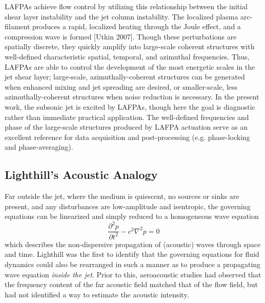 LAFPAs achieve flow control by utilizing this relationship between the initial shear layer instability and the jet column instability.
The localized plasma arc-filament produces a rapid, localized heating through the Joule effect, and a compression wave is formed [Utkin 2007].
Though these perturbations are spatially discrete, they quickly amplify into large-scale coherent structures with well-defined characteristic spatial, temporal, and azimuthal frequencies.
Thus, LAFPAs are able to control the development of the most energetic scales in the jet shear layer; large-scale, azimuthally-coherent structures can be generated when enhanced mixing and jet spreading are desired, or smaller-scale, less azimuthally-coherent structures when noise reduction is necessary. 
In the present work, the subsonic jet is excited by LAFPAs, though here the goal is diagnostic rather than immediate practical application.
The well-defined frequencies and phase of the large-scale structures produced by LAFPA actuation serve as an excellent reference for data acquisition and post-processing (e.g. phase-locking and phase-averaging).

\subsection{Lighthill's Acoustic Analogy}
Far outside the jet, where the medium is quiescent, no sources or sinks are present, and any disturbances are low-amplitude and isentropic, the governing equations can be linearized and simply reduced to a homogeneous wave equation
\begin{equation}
	\frac{\partial^2 p}{\partial t^2} - c^2 \nabla ^2 p = 0
\end{equation}
which describes the non-dispersive propagation of (acoustic) waves through space and time.
Lighthill \citep{Lighthill1952} was the first to identify that the governing equations for fluid dynamics could also be rearranged in such a manner as to produce a propagating wave equation \textit{inside the jet}.
Prior to this, aeroacoustic studies had observed that the frequency content of the far acoustic field matched that of the flow field, but had not identified a way to estimate the acoustic intensity.

